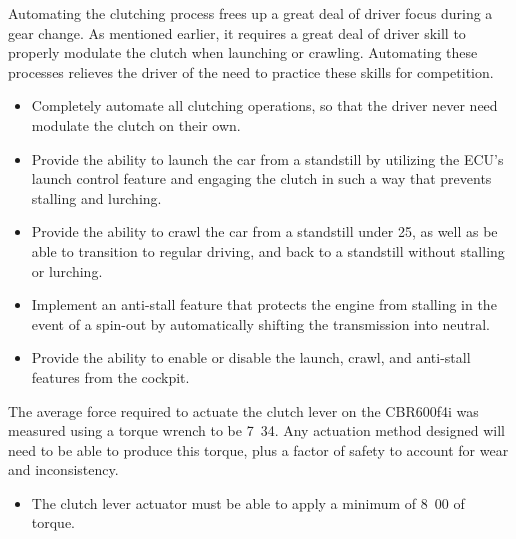 Automating the clutching process frees up a great deal of driver focus during a gear change. As mentioned earlier, it requires a great deal of driver skill to properly modulate the clutch when launching or crawling. Automating these processes relieves the driver of the need to practice these skills for competition.

\begin{itemize}
\item Completely automate all clutching operations, so that the driver never need modulate the clutch on their own.
\item Provide the ability to launch the car from a standstill by utilizing the ECU's launch control feature and engaging the clutch in such a way that prevents stalling and lurching.
\item Provide the ability to crawl the car from a standstill under \unit{25}{\kilo\metre\per\hour}, as well as be able to transition to regular driving, and back to a standstill without stalling or lurching.
\item Implement an anti-stall feature that protects the engine from stalling in the event of a spin-out by automatically shifting the transmission into neutral.
\item Provide the ability to enable or disable the launch, crawl, and anti-stall features from the cockpit.
\end{itemize}
  
The average force required to actuate the clutch lever on the CBR600f4i was measured using a torque wrench to be \unit{7.34}{\newton\metre}. Any actuation method designed will need to be able to produce this torque, plus a factor of safety to account for wear and inconsistency.

\begin{itemize}
\item The clutch lever actuator must be able to apply a minimum of \unit{8.00}{\newton\metre} of torque.
\end{itemize}  
